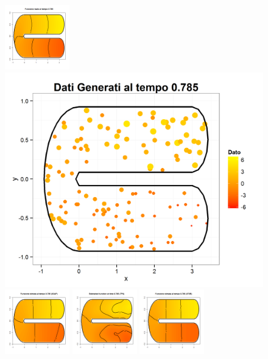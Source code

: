 \documentclass[a4paper,11pt,twoside,openright]{book}							%
\begin{document}
\begin{landscape}
\begin{figure}
\includegraphics[width=0.25\textwidth]{immagini/simulazioni_covar/REALEtempo2.png}
\includegraphics[height=0.25\textwidth]{immagini/simulazioni_covar/Dati_tempo2.png}
\includegraphics[width=0.25\textwidth]{immagini/simulazioni_covar/SOAPtempo2.png}
\includegraphics[width=0.25\textwidth]{immagini/simulazioni_covar/TPStempo2.png}
\includegraphics[width=0.25\textwidth]{immagini/simulazioni_covar/STSRtempo2.png}


\end{figure}
\end{landscape}
\end{document}
